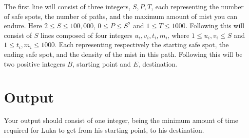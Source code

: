 The first line will consist of three integers, $S, P, T$, each representing the number of safe spots, the number of paths, and the maximum amount of mist you can endure. Here $2 \leq S \leq 100,000$, $ 0 \leq P \leq S^2$ and $1 \leq T \leq 1000$. Following this will consist of $S$ lines composed of four integers $u_i, v_i, t_i, m_i$, where $1 \leq u_i,v_i \leq S$ and $1 \leq t_i, m_i \leq 1000$. Each representing respectively the starting safe spot, the ending safe spot, and the density of the mist in this path. Following this will be two positive integers $B$, starting point and $E$, destination.

\section*{Output}

Your output should consist of one integer, being the minimum amount of time required for Luka to get from his starting point, to his destination.
